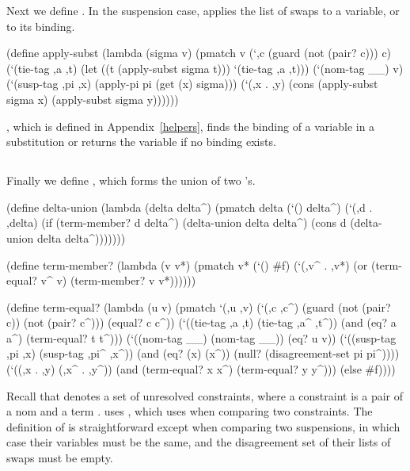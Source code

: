 Next we define .  In the suspension case,
 applies the list of swaps  to a variable,
or to its binding.

\schemedisplayspace
\begin{schemedisplay}
(define apply-subst
  (lambda (sigma v)
    (pmatch v
      (`,c (guard (not (pair? c))) c)
      (`(tie-tag ,a ,t)
       (let ((t (apply-subst sigma t)))
         `(tie-tag ,a ,t)))      
      (`(nom-tag __) v)
      (`(susp-tag ,pi ,x) (apply-pi pi (get (x) sigma)))
      (`(,x . ,y) (cons (apply-subst sigma x) (apply-subst sigma y))))))
\end{schemedisplay}

\noindent {}, which is defined in Appendix~\ref{helpers},
finds the binding of a variable in a substitution or returns the
variable if no binding exists.

\subsection{{\it \deltaunionsymbol}}

Finally we define , which forms the union of
two 's.

\schemedisplayspace
\begin{schemedisplay}
(define delta-union
  (lambda (delta delta^)
    (pmatch delta
      (`() delta^)
      (`(,d . ,delta)
       (if (term-member? d delta^)
           (delta-union delta delta^)
           (cons d (delta-union delta delta^)))))))
\end{schemedisplay}
\newpage
\begin{schemedisplay}
(define term-member?
  (lambda (v v*)
    (pmatch v*
      (`() #f)
      (`(,v^ . ,v*) 
       (or (term-equal? v^ v) (term-member? v v*))))))

(define term-equal?
  (lambda (u v)
    (pmatch `(,u ,v)
      (`(,c ,c^) (guard (not (pair? c)) (not (pair? c^)))
       (equal? c c^))
      (`((tie-tag ,a ,t) (tie-tag ,a^ ,t^))
       (and (eq? a a^) (term-equal? t t^)))
      (`((nom-tag __) (nom-tag __)) (eq? u v))
      (`((susp-tag ,pi ,x) (susp-tag ,pi^ ,x^))
       (and (eq? (x) (x^)) (null? (disagreement-set pi pi^))))
      (`((,x . ,y) (,x^ . ,y^))
       (and (term-equal? x x^) (term-equal? y y^)))
      (else #f))))
\end{schemedisplay}

Recall that  denotes a set of unresolved
constraints, where a constraint is a pair of a nom  and a
term .   uses ,
which uses  when comparing two constraints.  The
definition of  is straightforward except when
comparing two suspensions, in which case their variables must be the
same, and the disagreement set of their lists of swaps must be empty.


